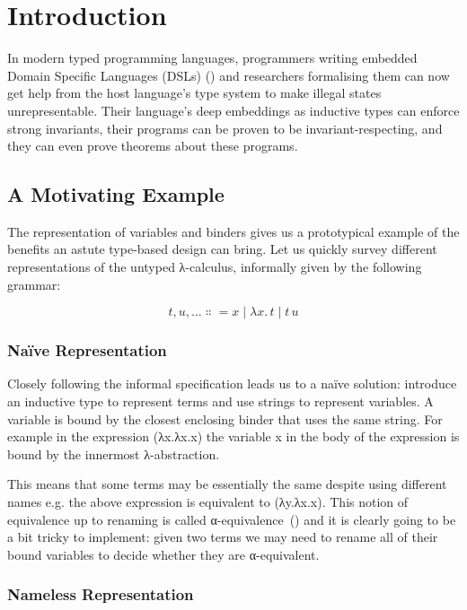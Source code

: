 \chapter{Introduction}
\label{introduction}

In modern typed programming languages, programmers writing embedded Domain
Specific Languages (DSLs) (\cite{hudak1996building}) and researchers
formalising them can now get help from the host language's type system
to make illegal states unrepresentable. Their language's deep embeddings
as inductive types can enforce strong invariants, their programs can be
proven to be invariant-respecting, and they can even prove theorems about
these programs.

\section{A Motivating Example}

The representation of variables and binders gives us a prototypical
example of the benefits an astute type-based design can bring. Let
us quickly survey different representations of the untyped λ-calculus,
informally given by the following grammar:

\[
t, u, \dots ∷= x \mid λx.\,t \mid t \, u
\]

\subsection{Naïve Representation}

Closely following the informal specification leads us to a naïve
solution: introduce an inductive type to represent terms and use
strings to represent variables. A variable is bound by the closest
enclosing binder that uses the same string. For example in the
expression (λx.λx.x) the variable x in the body of the expression is
bound by the innermost λ-abstraction.

This means that some terms may be essentially the same despite using
different names e.g. the above expression is equivalent to (λy.λx.x).
%
This notion of equivalence up to renaming is called
α-equivalence~(\cite{DBLP:books/daglib/0067558}) and it is clearly
going to be a bit tricky to implement: given two terms we may need
to rename all of their bound variables to decide whether they are
α-equivalent.

\subsection{Nameless Representation}

